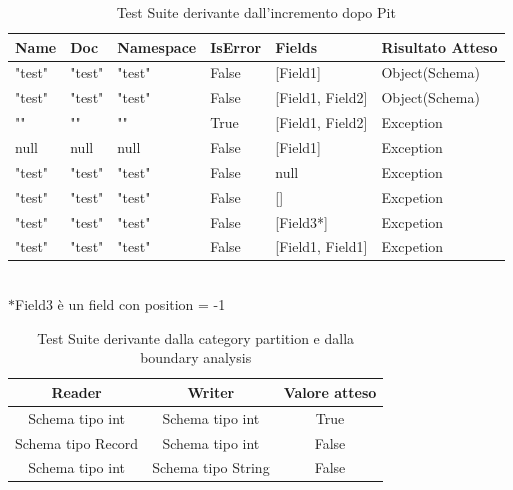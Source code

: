 \documentclass[12pt, a4paper]{article}
\begin{document}
\begin{table}[ht]
  \centering
  \caption[CreateRecord: Test Suite - Mutation Testing]{Test Suite derivante dall'incremento dopo Pit}
  \begin{tabular}{|l|l|l|l|l|l|}
    \hline
    \textbf{Name} & \textbf{Doc} & \textbf{Namespace}  & \textbf{IsError} & \textbf{Fields} & \textbf{Risultato Atteso} \\
    \hline
    "test" & "test" & "test" & False & [Field1] & Object(Schema) \\
    "test" & "test" & "test" & False & [Field1, Field2] & Object(Schema) \\
    "" & "" & "" & True & [Field1, Field2] & Exception \\
    null & null & null & False & [Field1] & Exception \\
    "test" & "test" & "test" & False & null & Exception \\
    "test" & "test" & "test" & False & [] & Excpetion \\
    "test" & "test" & "test" & False & [Field3*] & Excpetion \\
    "test" & "test" & "test" & False & [Field1, Field1] & Excpetion \\
    \hline
  \end{tabular}
   \\$\ast$Field3 è un field con position = -1
  \label{tab:PitCreateRecord1}
\end{table}



\begin{table}[ht]
  \centering
  \caption[SchemaCompatibility: Test Suite - Category Partition]{Test Suite derivante dalla category partition e dalla boundary analysis}
  \begin{tabular}{|c|c|c|}
    \hline
    Reader & Writer & Valore atteso \\
    \hline
    Schema tipo int & Schema tipo int & True \\
    Schema tipo Record & Schema tipo int & False \\
    Schema tipo int & Schema tipo String & False \\
    \hline
  \end{tabular}
  \label{tab:TestSuiteSchemaCompatibility}
\end{table}
  
\end{document}
